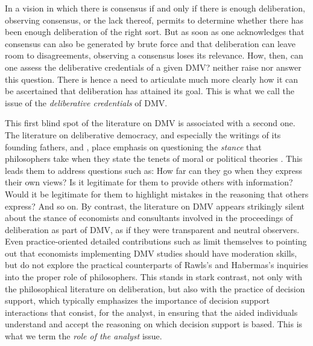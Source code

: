 \documentclass[a4paper, 11pt]{article}
\begin{document}
In a vision in which there is consensus if and only if there is enough deliberation, observing consensus, or the lack thereof, permits to determine whether there has been enough deliberation of the right sort.
But as soon as one acknowledges that consensus can also be generated by brute force and that deliberation can leave room to disagreements, observing a consensus loses its relevance. 
How, then, can one assess the deliberative credentials of a given \ac{DMV}? 
\citeauthor{bartkowski_beyond_2018} neither raise nor answer this question.
There is hence a need to articulate much more clearly how it can be ascertained that deliberation has attained its goal. This is what we call the issue of the \emph{deliberative credentials} of \ac{DMV}.

This first blind spot of the literature on \ac{DMV} is associated with a second one. The literature on deliberative democracy, and especially the writings of its founding fathers, \citet{rawls_political_2005} and \citet{habermas_faktizitat_1992}, place emphasis on questioning the \emph{stance} that philosophers take when they state the tenets of moral or political theories \citep{meinard_du_2014}. This leads them to address questions such as: How far can they go when they express their own views? Is it legitimate for them to provide others with information? Would it be legitimate for them to highlight mistakes in the reasoning that others express? And so on.
By contrast, the literature on \ac{DMV} appears strikingly silent about the stance of economists and consultants involved in the proceedings of deliberation as part of \ac{DMV}, as if they were transparent and neutral observers. Even practice-oriented detailed contributions such as \citet{schaafsma_guidance_2018} limit themselves to pointing out that economists implementing \ac{DMV} studies should have moderation skills, but do not explore the practical counterparts of Rawls’s and Habermas’s inquiries into the proper role of philosophers. 
This stands in stark contrast, not only with the philosophical literature on deliberation, but also with the practice of decision support, which typically emphasizes the importance of decision support interactions that consist, for the analyst, in ensuring that the aided individuals understand and accept the reasoning on which decision support is based. 
This is what we term the \emph{role of the analyst} issue.
\end{document}
